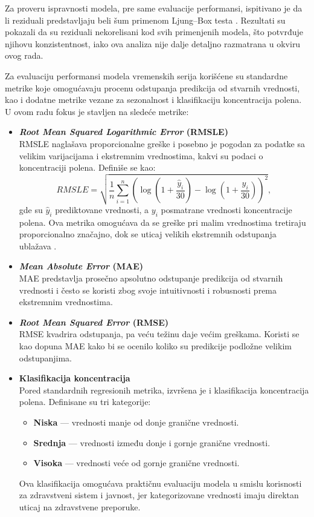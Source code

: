 \documentclass[12pt]{article}
\begin{document}
Za proveru ispravnosti modela, pre same evaluacije performansi, ispitivano je da li reziduali predstavljaju beli šum primenom Ljung–Box testa \cite{ljung1978}. Rezultati su pokazali da su reziduali nekorelisani kod svih primenjenih modela, što potvrđuje njihovu konzistentnost, iako ova analiza nije dalje detaljno razmatrana u okviru ovog rada.

Za evaluaciju performansi modela vremenskih serija korišćene su standardne metrike koje omogućavaju procenu odstupanja predikcija od stvarnih vrednosti, kao i dodatne metrike vezane za sezonalnost i klasifikaciju koncentracija polena. U ovom radu fokus je stavljen na sledeće metrike:

\begin{itemize}
    \item \textbf{\textit{Root Mean Squared Logarithmic Error} (RMSLE)} \\
    RMSLE naglašava proporcionalne greške i posebno je pogodan za podatke sa velikim varijacijama i ekstremnim vrednostima, kakvi su podaci o koncentraciji polena. Definiše se kao:
    \[
    RMSLE = \sqrt{ \frac{1}{n} \sum_{i=1}^{n} ( \log(1 + \frac{\hat{y}_i}{30}) - \log(1 + \frac{y_i}{30}) )^2 },
    \]
    gde su $\hat{y}_i$ prediktovane vrednosti, a $y_i$ posmatrane vrednosti koncentracije polena. Ova metrika omogućava da se greške pri malim vrednostima tretiraju proporcionalno značajno, dok se uticaj velikih ekstremnih odstupanja ublažava \cite{brockwell2002,hyndman2018forecasting}.

    \item \textbf{\textit{Mean Absolute Error} (MAE)} \\
    MAE predstavlja prosečno apsolutno odstupanje predikcija od stvarnih vrednosti i često se koristi zbog svoje intuitivnosti i robusnosti prema ekstremnim vrednostima.

    \item \textbf{\textit{Root Mean Squared Error} (RMSE)} \\
    RMSE kvadrira odstupanja, pa veću težinu daje većim greškama. Koristi se kao dopuna MAE kako bi se ocenilo koliko su predikcije podložne velikim odstupanjima.
    
    \item \textbf{Klasifikacija koncentracija} \\
    Pored standardnih regresionih metrika, izvršena je i klasifikacija koncentracija polena. Definisane su tri kategorije:
    \begin{itemize}
        \item \textbf{Niska} — vrednosti manje od donje granične vrednosti.
        \item \textbf{Srednja} — vrednosti između donje i gornje granične vrednosti.
        \item \textbf{Visoka} — vrednosti veće od gornje granične vrednosti.
    \end{itemize}
    Ova klasifikacija omogućava praktičnu evaluaciju modela u smislu korisnosti za zdravstveni sistem i javnost, jer kategorizovane vrednosti imaju direktan uticaj na zdravstvene preporuke.


\end{itemize}
\end{document}
